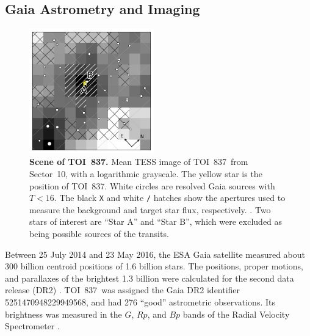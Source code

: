 \documentclass[12pt,twocolumn,tighten]{aastex63}
\newcommand{\tn}{TOI~837} %
\begin{document}
\subsection{Gaia Astrometry and Imaging}
\label{subsec:gaia}

\begin{figure}[!t]
	\begin{center}
		\leavevmode
		\includegraphics[width=0.48\textwidth]{f2.pdf}
	\end{center}
	\vspace{-0.6cm}
	\caption{ {\bf Scene of \tn.}
    Mean TESS image of \tn\ from Sector~10, with a logarithmic grayscale. The yellow star is
    the position of \tn.  White circles are resolved Gaia sources with
    $T<16$.  The black \texttt{X} and white \texttt{/} hatches
    show the apertures used to measure the background and target star
    flux, respectively. .  Two stars of interest are ``Star A'' and
    ``Star B'', which were excluded as being possible sources of the
    transits.
		\label{fig:scene}
	}
\end{figure}

Between 25 July 2014 and 23 May 2016, the ESA Gaia satellite measured
about 300 billion centroid positions of 1{.}6 billion stars.  The
positions, proper motions, and parallaxes of the brightest 1{.}3
billion were calculated for the second data release (DR2)
\citep{gaia_collaboration_gaia_2016,lindegren_gaiasoln_2018,gaia_collaboration_gaia_2018}.
\tn\ was assigned the Gaia DR2 identifier 5251470948229949568, and had
276 ``good'' astrometric observations. Its brightness was measured in
the $G$, $Rp$, and $Bp$ bands of the Radial Velocity Spectrometer
\citep{cropper_gaia_2018,evans_gaia_2018}.  
\end{document}
